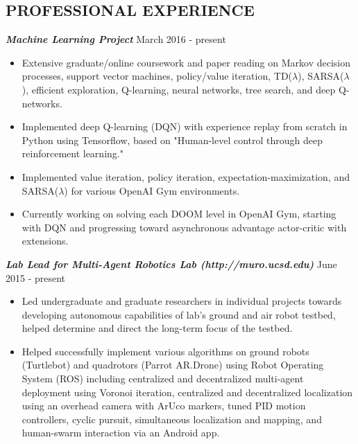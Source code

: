 \documentclass{res}
\begin{document}
\begin{resume}
\section{PROFESSIONAL EXPERIENCE}
\vspace{1ex}
{\sl \bf Machine Learning Project} \hfill March 2016 - present
\vspace*{.5ex}
\begin{itemize}
\item Extensive graduate/online coursework and paper reading on Markov decision processes, support vector machines, policy/value iteration, TD($\lambda$), SARSA($\lambda$), efficient exploration, Q-learning, neural networks, tree search, and deep Q-networks.
\vspace*{-.5ex}
\item Implemented deep Q-learning (DQN) with experience replay from scratch in Python using Tensorflow, based on "Human-level control through deep reinforcement learning."
\vspace*{-.5ex}
\item Implemented value iteration, policy iteration, expectation-maximization, and SARSA($\lambda$) for various OpenAI Gym environments. 
\vspace*{-.5ex}
\item Currently working on solving each DOOM level in OpenAI Gym, starting with DQN and progressing toward asynchronous advantage actor-critic with extensions.
\end{itemize}
\vspace*{-1ex}
{\sl \bf Lab Lead for Multi-Agent Robotics Lab (http://muro.ucsd.edu)} \hfill June 2015 - present 
\vspace*{.5ex}
\begin{itemize}
\item Led undergraduate and graduate researchers in individual projects towards developing autonomous capabilities of lab's ground and air robot testbed, helped determine and direct the long-term focus of the testbed. 
\vspace*{-.5ex}
\item Helped successfully implement various algorithms on ground robots (Turtlebot) and quadrotors (Parrot AR.Drone) using Robot Operating System (ROS) including centralized and decentralized multi-agent deployment using Voronoi iteration, centralized and decentralized localization using an overhead camera with ArUco markers, tuned PID motion controllers, cyclic pursuit, simultaneous localization and mapping, and human-swarm interaction via an Android app.

\end{itemize}
\end{resume}
\end{document}
